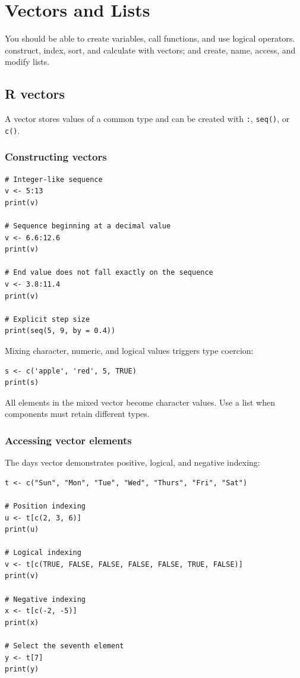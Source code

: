 \chapter{Vectors and Lists}
\label{chap:vectors-lists}

\chapterguide
  {You should be able to create variables, call functions, and use logical operators.}
  {construct, index, sort, and calculate with vectors; and create, name, access, and modify lists.}

\section{R vectors}

A vector stores values of a common type and can be created with \texttt{:}, \texttt{seq()}, or \texttt{c()}.

\subsection{Constructing vectors}

\begin{lstlisting}[style=dsr]
# Integer-like sequence
v <- 5:13
print(v)

# Sequence beginning at a decimal value
v <- 6.6:12.6
print(v)

# End value does not fall exactly on the sequence
v <- 3.8:11.4
print(v)

# Explicit step size
print(seq(5, 9, by = 0.4))
\end{lstlisting}

Mixing character, numeric, and logical values triggers type coercion:

\begin{lstlisting}[style=dsr]
s <- c('apple', 'red', 5, TRUE)
print(s)
\end{lstlisting}

\begin{keyidea}
All elements in the mixed vector become character values. Use a list when components must retain different types.
\end{keyidea}

\subsection{Accessing vector elements}

The days vector demonstrates positive, logical, and negative indexing:

\begin{lstlisting}[style=dsr]
t <- c("Sun", "Mon", "Tue", "Wed", "Thurs", "Fri", "Sat")

# Position indexing
u <- t[c(2, 3, 6)]
print(u)

# Logical indexing
v <- t[c(TRUE, FALSE, FALSE, FALSE, FALSE, TRUE, FALSE)]
print(v)

# Negative indexing
x <- t[c(-2, -5)]
print(x)

# Select the seventh element
y <- t[7]
print(y)
\end{lstlisting}

